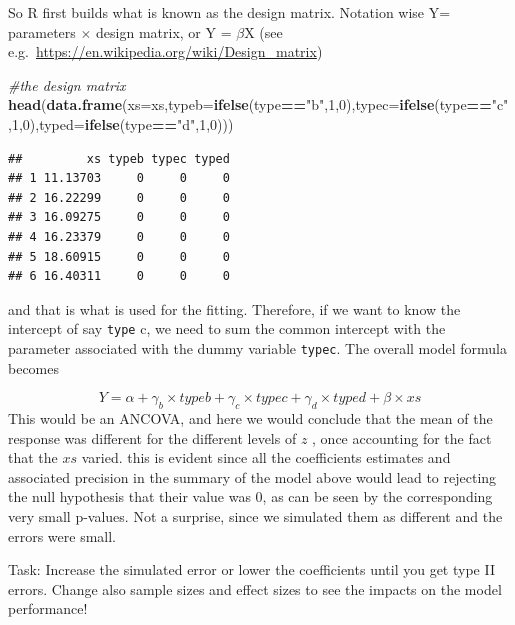 \documentclass[
]{book}
\newenvironment{Shaded}{\begin{snugshade}}{\end{snugshade}}
\newcommand{\AttributeTok}[1]{\textcolor[rgb]{0.13,0.29,0.53}{#1}}
\newcommand{\CommentTok}[1]{\textcolor[rgb]{0.56,0.35,0.01}{\textit{#1}}}
\newcommand{\DecValTok}[1]{\textcolor[rgb]{0.00,0.00,0.81}{#1}}
\newcommand{\FunctionTok}[1]{\textcolor[rgb]{0.13,0.29,0.53}{\textbf{#1}}}
\newcommand{\NormalTok}[1]{#1}
\newcommand{\SpecialCharTok}[1]{\textcolor[rgb]{0.81,0.36,0.00}{\textbf{#1}}}
\newcommand{\StringTok}[1]{\textcolor[rgb]{0.31,0.60,0.02}{#1}}
\begin{document}
So R first builds what is known as the design matrix. Notation wise Y= parameters \(\times\) design matrix, or Y = \(\beta\)X (see e.g.~\url{https://en.wikipedia.org/wiki/Design_matrix})

\begin{Shaded}
\begin{Highlighting}[]
\CommentTok{\#the design matrix}
\FunctionTok{head}\NormalTok{(}\FunctionTok{data.frame}\NormalTok{(}\AttributeTok{xs=}\NormalTok{xs,}\AttributeTok{typeb=}\FunctionTok{ifelse}\NormalTok{(type}\SpecialCharTok{==}\StringTok{"b"}\NormalTok{,}\DecValTok{1}\NormalTok{,}\DecValTok{0}\NormalTok{),}\AttributeTok{typec=}\FunctionTok{ifelse}\NormalTok{(type}\SpecialCharTok{==}\StringTok{"c"}\NormalTok{,}\DecValTok{1}\NormalTok{,}\DecValTok{0}\NormalTok{),}\AttributeTok{typed=}\FunctionTok{ifelse}\NormalTok{(type}\SpecialCharTok{==}\StringTok{"d"}\NormalTok{,}\DecValTok{1}\NormalTok{,}\DecValTok{0}\NormalTok{)))}
\end{Highlighting}
\end{Shaded}

\begin{verbatim}
##         xs typeb typec typed
## 1 11.13703     0     0     0
## 2 16.22299     0     0     0
## 3 16.09275     0     0     0
## 4 16.23379     0     0     0
## 5 18.60915     0     0     0
## 6 16.40311     0     0     0
\end{verbatim}

and that is what is used for the fitting. Therefore, if we want to know the intercept of say \texttt{type} c, we need to sum the common intercept with the parameter associated with the dummy variable \texttt{typec}. The overall model formula becomes

\[Y= \alpha + \gamma_b × typeb + \gamma_c × typec + \gamma_d × typed +  \beta × xs\]
This would be an ANCOVA, and here we would conclude that the mean of the response was different for the different levels of \(z\) , once accounting for the fact that the \(xs\) varied. this is evident since all the coefficients estimates and associated precision in the summary of the model above would lead to rejecting the null hypothesis that their value was 0, as can be seen by the corresponding very small p-values. Not a surprise, since we simulated them as different and the errors were small.

Task: Increase the simulated error or lower the coefficients until you get type II errors. Change also sample sizes and effect sizes to see the impacts on the model performance!
\end{document}
